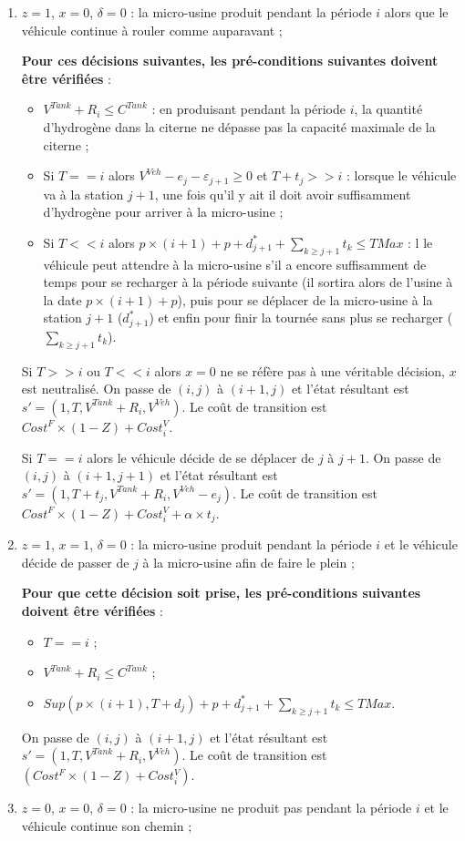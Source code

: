 \begin{enumerate}
	\item $z=1$, $x=0$, $\delta=0$ : la micro-usine produit pendant la période $i$ alors que le véhicule continue à rouler comme auparavant ;
	
	\textbf{Pour ces décisions suivantes, les pré-conditions suivantes doivent être vérifiées} : 
	\begin{itemize}[label=$\square$]
		\item $V^{Tank} + R_i \leq C^{Tank}$ : en produisant pendant la période $i$, la quantité d'hydrogène dans la citerne ne dépasse pas la capacité maximale de la citerne ;
		\item Si $T==i$ alors $V^{Veh}-e_j-\varepsilon_{j+1} \geq 0$ et $T+t_j>>i$ : lorsque le véhicule va à la station $j+1$, une fois qu'il y ait il doit avoir suffisamment d'hydrogène pour arriver à la micro-usine ;
		\item Si $T<<i$ alors $p \times (i+1) +p+d^*_{j+1} + \sum_{k\geq j+1}t_k \leq TMax$ : l le véhicule peut attendre à la micro-usine s'il a encore suffisamment de temps pour se recharger à la période suivante (il sortira alors de l'usine à la date $p \times (i+1) +p$), puis pour se déplacer de la micro-usine à la station $j+1$ ($d^*_{j+1}$) et enfin pour finir la tournée sans plus se recharger ($\sum_{k\geq j+1}t_k$).
	\end{itemize}
	Si $T>>i$ ou $T<<i$ alors $x=0$ ne se réfère pas à une véritable décision, $x$ est neutralisé. On passe de $(i,j)$ à $(i+1, j)$ et l'état résultant est $s'=(1, T,V^{Tank} + R_i, V^{Veh} )$. Le coût de transition est $Cost^F \times (1-Z) + Cost_i^V$.
	
	Si $T==i$ alors le véhicule décide de se déplacer de $j$ à $j+1$. On passe de $(i,j)$ à $(i+1, j+1)$ et l'état résultant est $s'=(1, T+t_j,V^{Tank} + R_i, V^{Veh}-e_j)$. Le coût de transition est $Cost^F \times (1-Z) + Cost_i^V + \alpha \times t_j$.
	
	\item $z=1$, $x=1$, $\delta=0$ : la micro-usine produit pendant la période $i$ et le véhicule décide de passer de $j$ à la micro-usine afin de faire le plein ;
	
	\textbf{Pour que cette décision soit prise, les pré-conditions suivantes doivent être vérifiées} :
	\begin{itemize}[label=$\square$]
		\item $T==i$ ;
		\item $V^{Tank} + R_i \leq C^{Tank}$ ;
		\item $Sup(p \times (i+1), T+d_j) +p+d^*_{j+1} + \sum_{k\geq j+1}t_k \leq TMax$.
	\end{itemize}
	On passe de $(i, j)$ à $(i + 1, j)$ et l'état résultant est $s'= (1, T, V^{Tank} + R_i, V^{Veh})$. Le coût de transition est $(Cost^F\times (1-Z) + Cost^V_i)$.
	\item $z=0$, $x=0$, $\delta=0$ : la micro-usine ne produit pas pendant la période $i$ et le véhicule continue son chemin ;
	

\end{enumerate}
